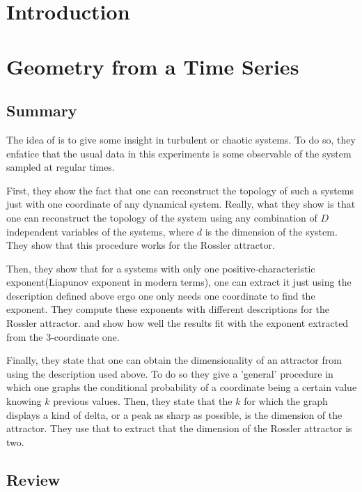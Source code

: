 \documentclass[10pt]{article}
\begin{document}
\maketitle
\section{Introduction}

\section{Geometry from a Time Series}

\subsection{Summary}

The idea of \cite{paper1} is to give some insight in turbulent or chaotic systems. To do so, they enfatice that the usual data in this experiments is some observable of the system sampled at regular times. 

First, they show the fact that one can reconstruct the topology of such a systems just with one coordinate of any dynamical system. Really, what they show is that one can reconstruct the topology of the system using any combination of $D$ independent variables of the systems, where $d$ is the dimension of the system. They show that this procedure works for the Rossler attractor.

Then, they show that for a systems with only one positive-characteristic exponent(Liapunov exponent in modern terms), one can extract it just using the description defined above ergo one only needs one coordinate to find the exponent. They compute these exponents with different descriptions for the Rossler attractor. and show how well the results fit with the exponent extracted from the 3-coordinate one.

Finally, they state that one can obtain the dimensionality of an attractor from using the description used above. To do so they give a 'general' procedure in which one graphs the conditional probability of a coordinate being a certain value knowing $k$ previous values. Then, they state that the $k$ for which the graph displays a kind of delta, or a peak as sharp as possible, is the dimension of the attractor. They use that to extract that the dimension of the Rossler attractor is two.

\subsection{Review}
\end{document}
